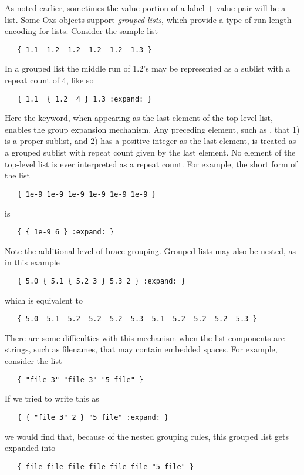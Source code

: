 %
\label{par:groupedLists}
As noted earlier, sometimes the value portion of a label + value pair
will be a list.  Some Oxs objects support \textit{grouped lists}, which
provide a type of run-length encoding for lists.  Consider the sample
list
\begin{verbatim}
   { 1.1  1.2  1.2  1.2  1.2  1.3 }
\end{verbatim}
In a grouped list the middle run of 1.2's may be represented as a
sublist with a repeat count of 4, like so
\begin{verbatim}
   { 1.1  { 1.2  4 } 1.3 :expand: }
\end{verbatim}
Here the  keyword, when appearing as the last element of
the top level list, enables the group expansion mechanism.  Any
preceding element, such as , that 1) is a proper
sublist, and 2) has a positive integer as the last element, is treated
as a grouped sublist with repeat count given by the last element.  No
element of the top-level list is ever interpreted as a repeat count.
For example, the short form of the list
\begin{verbatim}
   { 1e-9 1e-9 1e-9 1e-9 1e-9 1e-9 }
\end{verbatim}
is
\begin{verbatim}
   { { 1e-9 6 } :expand: }
\end{verbatim}
Note the additional level of brace grouping.  Grouped lists may also be
nested, as in this example
\begin{verbatim}
   { 5.0 { 5.1 { 5.2 3 } 5.3 2 } :expand: }
\end{verbatim}
which is equivalent to
\begin{verbatim}
   { 5.0  5.1  5.2  5.2  5.2  5.3  5.1  5.2  5.2  5.2  5.3 }
\end{verbatim}
There are some difficulties with this mechanism when the list components
are strings, such as filenames, that may contain embedded spaces.  For
example, consider the list
\begin{verbatim}
   { "file 3" "file 3" "5 file" }
\end{verbatim}
If we tried to write this as
\begin{verbatim}
   { { "file 3" 2 } "5 file" :expand: }
\end{verbatim}
we would find that, because of the nested grouping rules, this grouped
list gets expanded into
\begin{verbatim}
   { file file file file file file "5 file" }
\end{verbatim}
